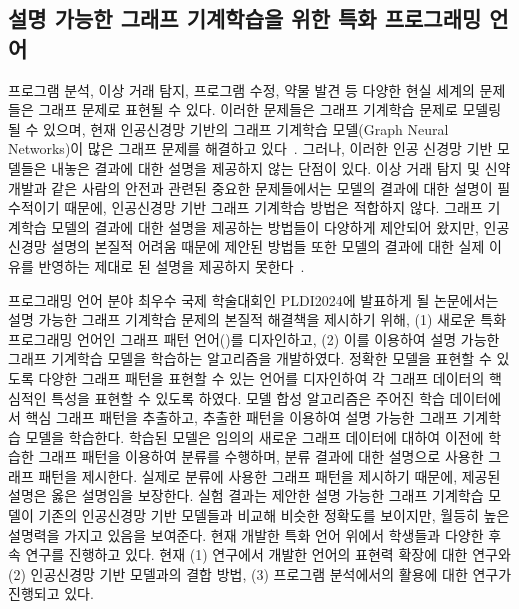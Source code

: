 \documentclass[11pt]{article}
\begin{document}
\begin{spacing}{1.145}
\section{설명 가능한 그래프 기계학습을 위한 특화 프로그래밍 언어}
%
프로그램 분석, 이상 거래 탐지, 프로그램 수정, 약물 발견 등 다양한 현실 세계의 문제들은 그래프 문제로 표현될 수 있다.
%
이러한 문제들은 그래프 기계학습 문제로 모델링될 수 있으며, 현재 인공신경망 기반의 그래프 기계학습 모델(Graph Neural Networks)이 많은 그래프 문제를 해결하고 있다~\cite{wu2019comprehensive}.
%
그러나, 이러한 인공 신경망 기반 모델들은 내놓은 결과에 대한 설명을 제공하지 않는 단점이 있다.
%
이상 거래 탐지 및 신약 개발과 같은 사람의 안전과 관련된 중요한 문제들에서는 모델의 결과에 대한 설명이 필수적이기 때문에, 인공신경망 기반 그래프 기계학습 방법은 적합하지 않다.
%
그래프 기계학습 모델의 결과에 대한 설명을 제공하는 방법들이 다양하게 제안되어 왔지만, 인공신경망 설명의 본질적 어려움 때문에 제안된 방법들 또한 모델의 결과에 대한 실제 이유를 반영하는 제대로 된 설명을 제공하지 못한다~\cite{yuan20survey}.

프로그래밍 언어 분야 최우수 국제 학술대회인 PLDI2024에 발표하게 될 논문에서는 설명 가능한 그래프 기계학습 문제의 본질적 해결책을 제시하기 위해, (1) 새로운 특화 프로그래밍 언어인 그래프 패턴 언어(\GDL)를 디자인하고, (2) 이를 이용하여 설명 가능한 그래프 기계학습 모델을 학습하는 알고리즘을 개발하였다.
%
정확한 모델을 표현할 수 있도록 다양한 그래프 패턴을 표현할 수 있는 언어를 디자인하여 각 그래프 데이터의 핵심적인 특성을 표현할 수 있도록 하였다.
%
모델 합성 알고리즘은 주어진 학습 데이터에서 핵심 그래프 패턴을 추출하고, 추출한 패턴을 이용하여 설명 가능한 그래프 기계학습 모델을 학습한다.
%
학습된 모델은 임의의 새로운 그래프 데이터에 대하여 이전에 학습한 그래프 패턴을 이용하여 분류를 수행하며, 분류 결과에 대한 설명으로 사용한 그래프 패턴을 제시한다.
%
실제로 분류에 사용한 그래프 패턴을 제시하기 때문에, 제공된 설명은 옳은 설명임을 보장한다.
%
실험 결과는 제안한 설명 가능한 그래프 기계학습 모델이 기존의 인공신경망 기반 모델들과 비교해 비슷한 정확도를 보이지만, 월등히 높은 설명력을 가지고 있음을 보여준다.
%
현재 개발한 특화 언어 위에서 학생들과 다양한 후속 연구를 진행하고 있다.
%
현재 (1) 연구에서 개발한 언어의 표현력 확장에 대한 연구와 (2) 인공신경망 기반 모델과의 결합 방법, (3) 프로그램 분석에서의 활용에 대한 연구가 진행되고 있다.






\end{spacing}
\end{document}
